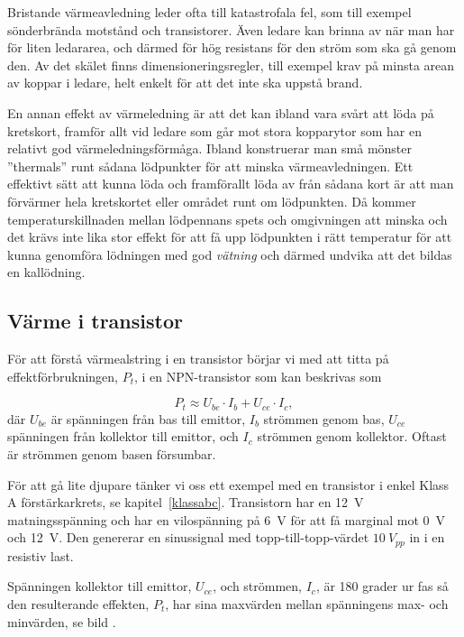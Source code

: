 Bristande värmeavledning leder ofta till katastrofala fel, som till exempel
sönderbrända motstånd och transistorer. Även ledare kan brinna av när man
har för liten ledararea, och därmed för hög resistans för den ström som
ska gå genom den. Av det skälet finns dimensioneringsregler, till exempel
krav på minsta arean av koppar i ledare, helt enkelt för att det inte ska
uppstå brand.

En annan effekt av värmeledning är att det kan ibland vara svårt att löda
på kretskort, framför allt vid ledare som går mot stora kopparytor som
har en relativt god värmeledningsförmåga. Ibland konstruerar man små mönster
''thermals'' runt sådana lödpunkter för att minska värmeavledningen.
Ett effektivt sätt att kunna löda och framförallt löda av från sådana
kort är att man förvärmer hela kretskortet eller området runt om
lödpunkten. Då kommer temperaturskillnaden mellan lödpennans spets och
omgivningen att minska och det krävs inte lika stor effekt för att få
upp lödpunkten i rätt temperatur för att kunna genomföra lödningen med god
\emph{vätning} och därmed undvika att det bildas en kallödning.

\subsection{Värme i transistor}


För att förstå värmealstring i en transistor börjar vi med att titta
på effektförbrukningen, \(P_t\), i en NPN-transistor som kan beskrivas
som

\[P_t \approx U_{be}\cdot I_b + U_{ce}\cdot I_c,\]
%
där \(U_{be}\) är spänningen från bas till emittor, \(I_b\)
strömmen genom bas,  \(U_{ce}\) spänningen från kollektor till
emittor, och \(I_c\) strömmen genom kollektor.
Oftast är strömmen genom basen försumbar.

För att gå lite djupare tänker vi oss ett exempel med en transistor i
enkel Klass A förstärkarkrets, se kapitel~\ref{klassabc}.
Transistorn har en \qty{12}{\volt} matningsspänning och har en
vilospänning på \qty{6}{\volt} för att få marginal mot \qty{0}{\volt}
och \qty{+12}{\volt}.
Den genererar en sinussignal med topp-till-topp-värdet \(10\ V_{pp}\)
in i en resistiv last.

Spänningen kollektor till emittor, \(U_{ce}\), och strömmen, \(I_c\),
är 180 grader ur fas så den resulterande effekten, \(P_t\), har sina
maxvärden mellan spänningens max- och minvärden, se bild
.
